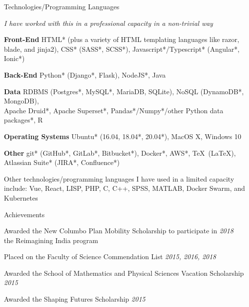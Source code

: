 \documentclass{resume} %
\begin{document}

\begin{rSection}{Technologies/Programming Languages}
    \item {\em * I have worked with this in a professional capacity in a non-trivial way}
    \item {\bf Front-End} HTML* (plus a variety of HTML templating languages like razor,
    blade, and jinja2), CSS* (SASS*, SCSS*), Javascript*/Typescript* (Angular*, Ionic*)
    \item {\bf Back-End} Python* (Django*, Flask), NodeJS*, Java
    \item {\bf Data} RDBMS (Postgres*, MySQL*, MariaDB, SQLite), NoSQL (DynamoDB*, MongoDB),
    \\ Apache Druid*, Apache Superset*, Pandas*/Numpy*/other Python data packages*, R
    \item {\bf Operating Systems} Ubuntu* (16.04, 18.04*, 20.04*), MacOS X, Windows 10
    \item {\bf Other} git* (GitHub*, GitLab*, Bitbucket*), Docker*, AWS*, \TeX\ (\LaTeX),
    Atlassian Suite* (JIRA*, Confluence*)
    \item Other technologies/programming languages I have used in a limited capacity include:
    Vue, React, LISP, PHP, C, C++, SPSS, MATLAB, Docker Swarm, and Kubernetes
\end{rSection}


\begin{rSection}{Achievements}
    \item Awarded the New Columbo Plan Mobility Scholarship to participate in \hfill {\em 2018}
    \\ the Reimagining India program
    \item Placed on the Faculty of Science Commendation List \hfill {\em 2015, 2016, 2018}
    \item Awarded the School of Mathematics and Physical Sciences Vacation Scholarship
    \hfill {\em 2015}
    \item Awarded the Shaping Futures Scholarship \hfill {\em 2015} \
\end{rSection}
\end{document}
